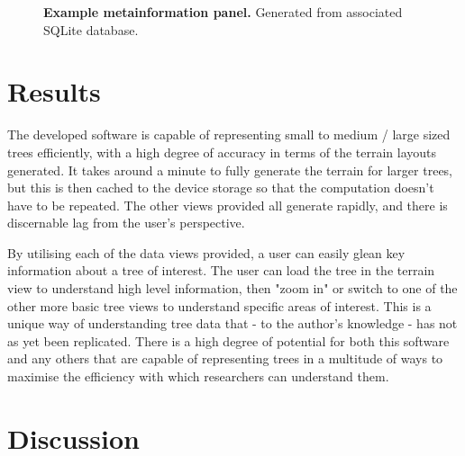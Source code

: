 \documentclass[10pt,letterpaper]{article}
\begin{document}
\begin{figure}[h!]
\caption{{\bf Example metainformation panel.} Generated from associated SQLite database.}
\label{fig4}
\end{figure}


\section*{Results}

The developed software is capable of representing small to medium / large sized trees efficiently, with a high degree of accuracy in terms of the terrain layouts generated. It takes around a minute to fully generate the terrain for larger trees, but this is then cached to the device storage so that the computation doesn't have to be repeated. The other views provided all generate rapidly, and there is discernable lag from the user's perspective. 

By utilising each of the data views provided, a user can easily glean key information about a tree of interest. The user can load the tree in the terrain view to understand high level information, then "zoom in" or switch to one of the other more basic tree views to understand specific areas of interest. This is a unique way of understanding tree data that - to the author's knowledge - has not as yet been replicated. There is a high degree of potential for both this software and any others that are capable of representing trees in a multitude of ways to maximise the efficiency with which researchers can understand them. 

\section*{Discussion}
\end{document}
